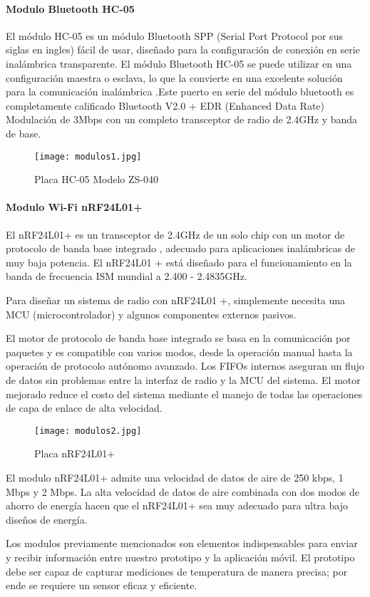 \clearpage

\paragraph{Modulo Bluetooth HC-05}
El módulo HC-05 es un módulo Bluetooth SPP (Serial Port Protocol por sus siglas en ingles) fácil de usar, diseñado para la configuración de conexión en serie inalámbrica transparente. El módulo Bluetooth HC-05 se puede utilizar en una configuración maestra o esclava, lo que la convierte en una excelente solución para la comunicación inalámbrica .Este puerto en serie del módulo bluetooth es completamente calificado Bluetooth V2.0 + EDR (Enhanced Data Rate) Modulación de 3Mbps con un completo transceptor de radio de 2.4GHz y banda de base\cite{bluetooth}.

\begin{figure}[H]
	\centering
	\texttt{[image: modulos1.jpg]}
	\caption{Placa HC-05 Modelo ZS-040}
\end{figure}

\paragraph{Modulo Wi-Fi nRF24L01+}
El nRF24L01+ es un transceptor de 2.4GHz de un solo chip con un motor de protocolo de banda base integrado
, adecuado para aplicaciones inalámbricas de muy baja potencia. El nRF24L01 + está diseñado
para el funcionamiento en la banda de frecuencia ISM mundial a 2.400 - 2.4835GHz\cite{nrf}.

\par \noindent
Para diseñar un sistema de radio con nRF24L01 +, simplemente necesita una MCU (microcontrolador) y algunos componentes externos pasivos.

\par \noindent
El motor de protocolo de banda base integrado se basa en la comunicación por paquetes
y es compatible con varios modos, desde la operación manual hasta la operación de protocolo autónomo avanzado. 
Los FIFOs internos aseguran un flujo de datos sin problemas entre la interfaz de radio y la MCU del sistema. El motor mejorado reduce el costo del sistema mediante el manejo de todas las operaciones de capa de enlace de alta velocidad\cite{nrf}.

\begin{figure}[H]
	\centering
	\texttt{[image: modulos2.jpg]}
	\caption{Placa nRF24L01+}
\end{figure}

\par \noindent
El modulo nRF24L01+ admite una velocidad de datos de aire de 250 kbps, 1 Mbps y 2 Mbps.
La alta velocidad de datos de aire combinada con dos modos de ahorro de energía hacen que el nRF24L01+ sea muy adecuado para ultra bajo
diseños de energía\cite{nrf}.

\par \noindent
Los modulos previamente mencionados son elementos indispensables para enviar y recibir información entre nuestro prototipo y la aplicación móvil. El prototipo debe ser capaz de capturar mediciones de temperatura de manera precisa; por ende se requiere un sensor eficaz y eficiente.

